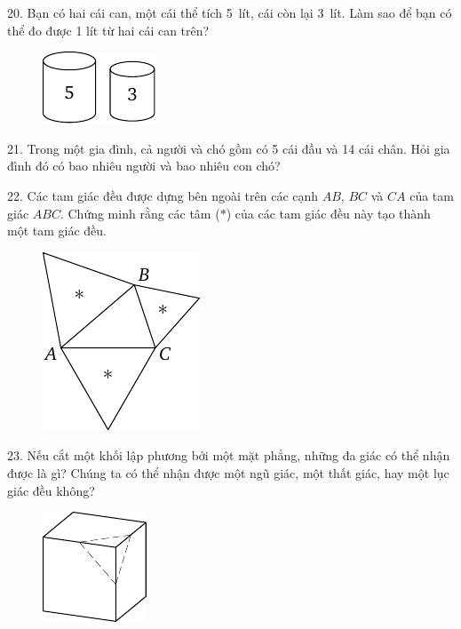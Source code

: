 \begin{problem}{20.}
	Bạn có hai cái can, một cái thể tích 5~lít, cái còn lại 3~lít. Làm sao để bạn có thể đo được 1 lít từ hai cái can trên?
	\begin{figure}
		\includegraphics{taskbook-4}
	\end{figure}
\end{problem}

\begin{problem}{21.}
	Trong một gia đình, cả người và chó gồm có 5 cái đầu và 14 cái chân. Hỏi gia đình đó có bao nhiêu người và bao nhiêu con chó?
\end{problem}

\begin{problem}{22.}
	Các tam giác đều được dựng bên ngoài trên các cạnh $AB$, $BC$ và $CA$ của tam giác $ABC$. Chứng minh rằng các tâm ($*$) của các tam giác đều này tạo thành một tam giác đều.
	\begin{figure}
		\includegraphics{taskbook-6}
	\end{figure}
\end{problem}

\begin{problem}{23.}
	Nếu cắt một khối lập phương bởi một mặt phẳng, những đa giác có thể nhận được là gì? Chúng ta có thể nhận được một ngũ giác, một thất giác, hay một lục giác đều không?
	\begin{figure}
		\includegraphics{taskbook-7}
	\end{figure}
\end{problem}

